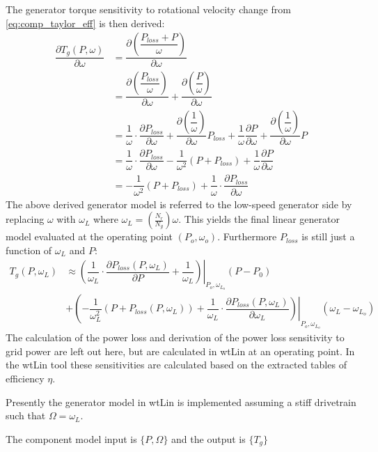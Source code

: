 The generator torque sensitivity to rotational velocity change from \cref{eq:comp_taylor_eff} is then derived:
\begin{align}
	\dfrac{\partial T_g(P, \omega)}{\partial \omega} & = \dfrac{\partial \left (\dfrac{P_{loss} +  P}{\omega}\right )}{\partial \omega} \\
	& = \dfrac{\partial \left (\dfrac{P_{loss}}{\omega} \right )}{\partial \omega} + \dfrac{\partial \left (\dfrac{P}{\omega} \right )}{\partial \omega} \\
	& = \dfrac{1}{\omega} \cdot \dfrac{\partial P_{loss}}{\partial \omega} + \dfrac{\partial \left (\dfrac{1}{\omega} \right)}{\partial \omega} P_{loss} + \dfrac{1}{\omega} \dfrac{\partial P}{\partial \omega} + \dfrac{\partial \left (\dfrac{1}{\omega} \right )}{\partial \omega} P \\
	& = \dfrac{1}{\omega} \cdot  \dfrac{\partial P_{loss}}{\partial \omega} - \dfrac{1}{\omega^2}(P + P_{loss}) + \dfrac{1}{\omega} \dfrac{\partial P}{\partial \omega} \\
	& = -\dfrac{1}{\omega^2}(P + P_{loss}) + \dfrac{1}{\omega} \cdot \dfrac{\partial P_{loss}}{\partial \omega}
\end{align}
The above derived generator model is referred to the low-speed generator side by replacing $ \omega $ with $ \omega_L $ where $ \omega_L = \left (\frac{N_r}{N_g} \right ) \omega $. This yields the final linear generator model evaluated at the operating point $ (P_o, \omega_o) $. Furthermore $P_{loss}$ is still just a function of $ \omega_L $ and $ P $:
\begin{equation}
	\begin{split}
		T_g(P, \omega_L) 	& \approx \left. \left ( \dfrac{1}{\omega_L} \cdot \dfrac{\partial P_{loss}(P, \omega_L)}{\partial P} + \dfrac{1}{\omega_L} \right ) \right |_{P_o,\omega_{L_o}} (P - P_0) \\ 
		& + \left ( -\dfrac{1}{\omega_L^2}(P + P_{loss}(P, \omega_L)) + \left. \dfrac{1}{\omega_L} \cdot \dfrac{\partial P_{loss}(P, \omega_L)}{\partial \omega_L} \right ) \right |_{P_o,\omega_{L_o}} (\omega_L - \omega_{L_o})
	\end{split}
\end{equation}
The calculation of the power loss and derivation of the power loss sensitivity to grid power are left out here, but are calculated in wtLin at an operating point. In the wtLin tool these sensitivities are calculated based on the extracted tables of efficiency $ \eta $.

Presently the generator model in wtLin is implemented assuming a stiff drivetrain such that $ \Omega = \omega_L $.

The component model input is $ \{P, \Omega\} $ and the output is $ \{T_g\} $

